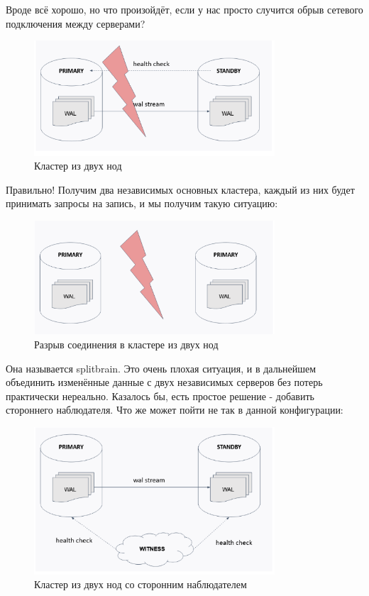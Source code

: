 Вроде всё хорошо, но что произойдёт, если у нас просто случится обрыв сетевого подключения между серверами?

\begin{figure}[h]
    \centering
    \includegraphics[width=0.8\textwidth]{assets/Patroni2.png}
    \caption{Кластер из двух нод}
    \label{fig:mesh1}
\end{figure}

Правильно! Получим два независимых основных кластера, каждый из них будет принимать запросы на запись, и мы получим такую ситуацию:

\begin{figure}[h]
    \centering
    \includegraphics[width=0.8\textwidth]{assets/Patroni3.png}
    \caption{Разрыв соединения в кластере из двух нод}
    \label{fig:mesh1}
\end{figure}

Она называется splitbrain. Это очень плохая ситуация, и в дальнейшем объединить изменённые данные с двух независимых серверов без потерь практически нереально.
Казалось бы, есть простое решение - добавить стороннего наблюдателя.
Что же может пойти не так в данной конфигурации:

\begin{figure}[h]
    \centering
    \includegraphics[width=0.8\textwidth]{assets/Patroni4.png}
    \caption{Кластер из двух нод со сторонним наблюдателем}
    \label{fig:mesh1}
\end{figure}

